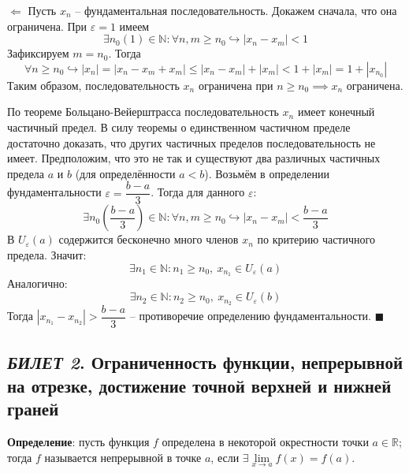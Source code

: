 \documentclass[12pt, a4paper, reqno]{article}
\begin{document}
    $\boxed{\Leftarrow}$ Пусть $x_n$ -- фундаментальная последовательность. Докажем сначала, что она
    ограничена. При $\varepsilon = 1$ имеем
    \begin{equation*}
        \exists n_0(1)\in\mathbb{N}: \forall n, m \geq n_0 \hookrightarrow |x_n - x_m| < 1
    \end{equation*}
    Зафиксируем $m = n_0$. Тогда
    \begin{equation*}
        \forall n \geq n_0 \hookrightarrow |x_n| = |x_n - x_m + x_m| \leq |x_n - x_m| + |x_m| <
        1 + |x_m| = 1 + |x_{n_0}|
    \end{equation*}
    Таким образом, последовательность $x_n$ ограничена при $n \geq n_0 \implies x_n$ ограничена.

    По теореме Больцано-Вейерштрасса последовательность $x_n$ имеет конечный частичный предел. В
    силу теоремы о единственном частичном пределе достаточно доказать, что других частичных пределов
    последовательность не имеет. Предположим, что это не так и существуют два различных частичных
    предела $a$ и $b$ (для определённости $a < b$). Возьмём в определении фундаментальности
    $\varepsilon = \dfrac{b - a}{3}$. Тогда для данного $\varepsilon$:
    \begin{equation*}
        \exists n_0\left(\dfrac{b - a}{3}\right)\in\mathbb{N}: \forall n, m \geq n_0
        \hookrightarrow|x_n - x_m| < \dfrac{b - a}{3}
    \end{equation*}
    В $U_{\varepsilon}(a)$ содержится бесконечно много членов $x_n$ по критерию частичного предела.
    Значит:
    \begin{equation*}
        \exists n_1\in\mathbb{N}: n_1 \geq n_0,\ x_{n_1}\in U_{\varepsilon}(a)
    \end{equation*}
    Аналогично:
    \begin{equation*}
        \exists n_2\in\mathbb{N}: n_2 \geq n_0,\ x_{n_2}\in U_{\varepsilon}(b)
    \end{equation*}
    Тогда $|x_{n_1} - x_{n_2}| > \dfrac{b - a}{3}$ -- противоречие определению фундаментальности.
    $\blacksquare$

\newpage
\subsection{\textit{БИЛЕТ 2}. Ограниченность функции, непрерывной на отрезке, достижение точной верхней и нижней
            граней}

    \textbf{Определение}: пусть функция $f$ определена в некоторой окрестности точки
    $a\in\mathbb{R}$; тогда $f$ называется непрерывной в точке $a$, если
    $\exists\lim\limits_{x\to a} f(x) = f(a)$.
\end{document}

